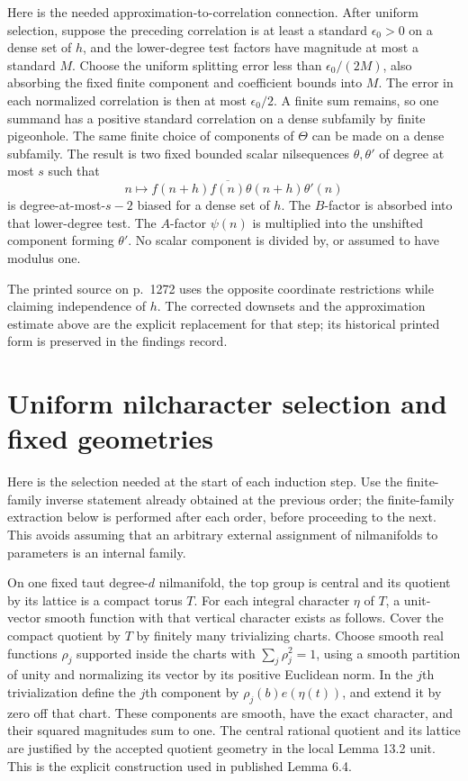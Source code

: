 \documentclass[11pt]{article}
\begin{document}
Here is the needed approximation-to-correlation connection. After uniform
selection, suppose the preceding correlation is at least a standard
$\epsilon_0>0$ on a dense set of $h$, and the lower-degree test factors
have magnitude at most a standard $M$. Choose the uniform splitting error
less than $\epsilon_0/(2M)$, also absorbing the fixed finite component and
coefficient bounds into $M$. The error in each normalized correlation is
then at most $\epsilon_0/2$. A finite sum remains, so one summand has a
positive standard correlation on a dense subfamily by finite pigeonhole.
The same finite choice of components of $\Theta$ can be made on a dense
subfamily. The result is two fixed bounded scalar nilsequences
$\theta,\theta'$ of degree at most $s$ such that
\begin{equation}\label{eq:factorcorr}
 n\longmapsto f(n+h)\overline{f(n)}\theta(n+h)\theta'(n)
\end{equation}
is degree-at-most-$s-2$ biased for a dense set of $h$.
The $B$-factor is absorbed into that lower-degree test. The $A$-factor
$\psi(n)$ is multiplied into the unshifted component forming $\theta'$.
No scalar component is divided by, or assumed to have modulus one.

The printed source on p.~1272 uses the opposite coordinate restrictions
while claiming independence of $h$. The corrected downsets and the
approximation estimate above are the explicit replacement for that step;
its historical printed form is preserved in the findings record.

\section{Uniform nilcharacter selection and fixed geometries}

Here is the selection needed at the start of each induction step. Use
the finite-family inverse statement already obtained at the previous
order; the finite-family extraction below is performed after each order,
before proceeding to the next. This avoids assuming that an arbitrary
external assignment of nilmanifolds to parameters is an internal family.

On one fixed taut degree-$d$ nilmanifold, the top group is central and
its quotient by its lattice is a compact torus $T$. For each integral
character $\eta$ of $T$, a unit-vector smooth function with that vertical
character exists as follows. Cover the compact quotient by $T$ by finitely
many trivializing charts. Choose smooth real functions $\rho_j$ supported
inside the charts with $\sum_j\rho_j^2=1$, using a smooth partition of
unity and normalizing its vector by its positive Euclidean norm. In the
$j$th trivialization define the $j$th component by
$\rho_j(b)e(\eta(t))$, and extend it by zero off that chart. These
components are smooth, have the exact character, and their squared
magnitudes sum to one. The central rational quotient and its lattice
are justified by the accepted quotient geometry in the local Lemma 13.2
unit. This is the explicit construction used in published Lemma 6.4.
\end{document}
